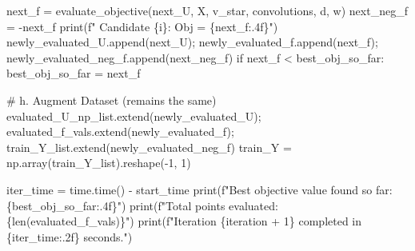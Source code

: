 \documentclass[
  letterpaper,
  DIV=11,
  numbers=noendperiod]{scrartcl}
\newenvironment{Shaded}{\begin{snugshade}}{\end{snugshade}}
\newcommand{\BuiltInTok}[1]{\textcolor[rgb]{0.00,0.23,0.31}{#1}}
\newcommand{\CommentTok}[1]{\textcolor[rgb]{0.37,0.37,0.37}{#1}}
\newcommand{\ControlFlowTok}[1]{\textcolor[rgb]{0.00,0.23,0.31}{#1}}
\newcommand{\DecValTok}[1]{\textcolor[rgb]{0.68,0.00,0.00}{#1}}
\newcommand{\NormalTok}[1]{\textcolor[rgb]{0.00,0.23,0.31}{#1}}
\newcommand{\OperatorTok}[1]{\textcolor[rgb]{0.37,0.37,0.37}{#1}}
\newcommand{\SpecialCharTok}[1]{\textcolor[rgb]{0.37,0.37,0.37}{#1}}
\newcommand{\SpecialStringTok}[1]{\textcolor[rgb]{0.13,0.47,0.30}{#1}}
\begin{document}
\begin{Shaded}
\begin{Highlighting}[]
\NormalTok{        next\_f }\OperatorTok{=}\NormalTok{ evaluate\_objective(next\_U, X, v\_star, convolutions, d, w)}
\NormalTok{        next\_neg\_f }\OperatorTok{=} \OperatorTok{{-}}\NormalTok{next\_f}
        \BuiltInTok{print}\NormalTok{(}\SpecialStringTok{f"  Candidate }\SpecialCharTok{\{}\NormalTok{i}\SpecialCharTok{\}}\SpecialStringTok{: Obj = }\SpecialCharTok{\{}\NormalTok{next\_f}\SpecialCharTok{:.4f\}}\SpecialStringTok{"}\NormalTok{)}
\NormalTok{        newly\_evaluated\_U.append(next\_U)}\OperatorTok{;}\NormalTok{ newly\_evaluated\_f.append(next\_f)}\OperatorTok{;}\NormalTok{ newly\_evaluated\_neg\_f.append(next\_neg\_f)}
        \ControlFlowTok{if}\NormalTok{ next\_f }\OperatorTok{\textless{}}\NormalTok{ best\_obj\_so\_far: best\_obj\_so\_far }\OperatorTok{=}\NormalTok{ next\_f}

    \CommentTok{\# h. Augment Dataset (remains the same)}
\NormalTok{    evaluated\_U\_np\_list.extend(newly\_evaluated\_U)}\OperatorTok{;}\NormalTok{ evaluated\_f\_vals.extend(newly\_evaluated\_f)}\OperatorTok{;}\NormalTok{ train\_Y\_list.extend(newly\_evaluated\_neg\_f)}
\NormalTok{    train\_Y }\OperatorTok{=}\NormalTok{ np.array(train\_Y\_list).reshape(}\OperatorTok{{-}}\DecValTok{1}\NormalTok{, }\DecValTok{1}\NormalTok{)}

\NormalTok{    iter\_time }\OperatorTok{=}\NormalTok{ time.time() }\OperatorTok{{-}}\NormalTok{ start\_time}
    \BuiltInTok{print}\NormalTok{(}\SpecialStringTok{f"Best objective value found so far: }\SpecialCharTok{\{}\NormalTok{best\_obj\_so\_far}\SpecialCharTok{:.4f\}}\SpecialStringTok{"}\NormalTok{)}
    \BuiltInTok{print}\NormalTok{(}\SpecialStringTok{f"Total points evaluated: }\SpecialCharTok{\{}\BuiltInTok{len}\NormalTok{(evaluated\_f\_vals)}\SpecialCharTok{\}}\SpecialStringTok{"}\NormalTok{)}
    \BuiltInTok{print}\NormalTok{(}\SpecialStringTok{f"Iteration }\SpecialCharTok{\{}\NormalTok{iteration }\OperatorTok{+} \DecValTok{1}\SpecialCharTok{\}}\SpecialStringTok{ completed in }\SpecialCharTok{\{}\NormalTok{iter\_time}\SpecialCharTok{:.2f\}}\SpecialStringTok{ seconds."}\NormalTok{)}



\end{Highlighting}
\end{Shaded}
\end{document}

